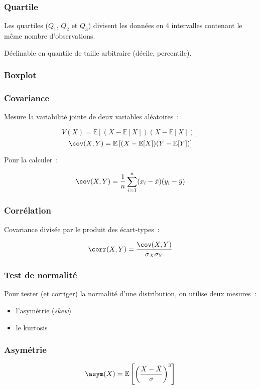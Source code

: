 \begin{frame}[fragile]
  \frametitle{Quartile}

  Les quartiles ($Q_1$, $Q_2$ et $Q_3$) divisent les données en 4
  intervalles contenant le même nombre d'observations.

  Déclinable en quantile de taille arbitraire (décile, percentile).

\end{frame}

\begin{frame}[fragile]
  \frametitle{Boxplot}

\end{frame}

\begin{frame}[fragile]
  \frametitle{Covariance}
  Mesure la variabilité jointe de deux variables aléatoires :

  \[
    V(X) = \mathbb{E}\left[(X - \mathbb{E}[X])(X - \mathbb{E}[X])\right]
  \]
  \[
    \cov(X, Y) = \mathbb{E}\left[(X - \mathbb{E}[X])(Y - \mathbb{E}[Y])\right]
  \]

  Pour la calculer :

  \[
    \cov(X, Y) = \frac{1}{n}\sum_{i = 1}^{n}(x_i - \bar{x})(y_i - \bar{y})
  \]
\end{frame}

\begin{frame}[fragile]
  \frametitle{Corrélation}
  Covariance divisée par le produit des écart-types :

  \[
    \corr(X, Y) = \frac{\cov(X, Y)}{\sigma_X\sigma_Y}
  \]

\end{frame}

\begin{frame}
  \frametitle{Test de normalité}

  Pour tester (et corriger) la normalité d'une distribution, on
  utilise deux mesures :

  \begin{itemize}
  \item l'asymétrie (\textit{skew})
  \item le kurtosis
  \end{itemize}
\end{frame}

\begin{frame}
  \frametitle{Asymétrie}


  \[
    \asym(X) = \mathbb{E} \left[\left(\frac{X - \bar{X}}{\sigma}\right)^3\right]
  \]
\end{frame}

